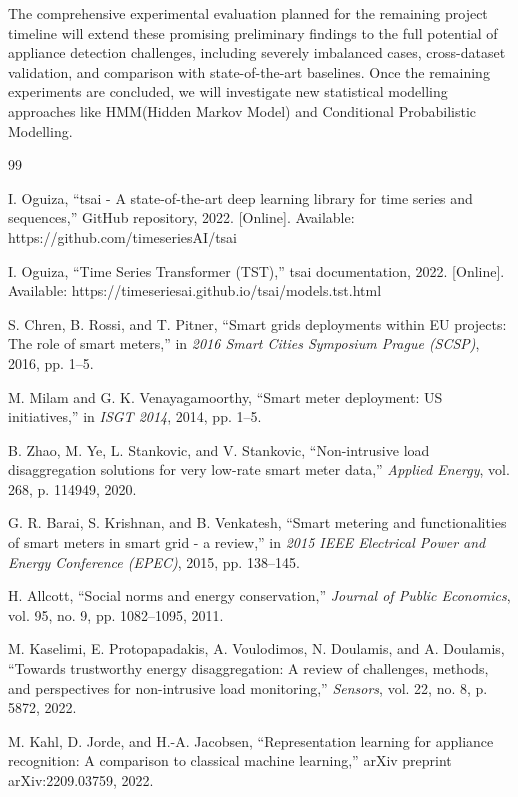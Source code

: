 \documentclass[conference]{IEEEtran}
\begin{document}
The comprehensive experimental evaluation planned for the remaining project timeline will extend these promising preliminary findings to the full potential of appliance detection challenges, including severely imbalanced cases, cross-dataset validation, and comparison with state-of-the-art baselines. Once the remaining experiments are concluded, we will investigate new statistical modelling approaches like HMM(Hidden Markov Model) and Conditional Probabilistic Modelling.
\begin{thebibliography}{99}

I. Oguiza, ``tsai - A state-of-the-art deep learning library for time series and sequences,'' GitHub repository, 2022. [Online]. Available: https://github.com/timeseriesAI/tsai

I. Oguiza, ``Time Series Transformer (TST),'' tsai documentation, 2022. [Online]. Available: https://timeseriesai.github.io/tsai/models.tst.html

S. Chren, B. Rossi, and T. Pitner, ``Smart grids deployments within EU projects: The role of smart meters,'' in \textit{2016 Smart Cities Symposium Prague (SCSP)}, 2016, pp. 1--5.

M. Milam and G. K. Venayagamoorthy, ``Smart meter deployment: US initiatives,'' in \textit{ISGT 2014}, 2014, pp. 1--5.

B. Zhao, M. Ye, L. Stankovic, and V. Stankovic, ``Non-intrusive load disaggregation solutions for very low-rate smart meter data,'' \textit{Applied Energy}, vol. 268, p. 114949, 2020.

G. R. Barai, S. Krishnan, and B. Venkatesh, ``Smart metering and functionalities of smart meters in smart grid - a review,'' in \textit{2015 IEEE Electrical Power and Energy Conference (EPEC)}, 2015, pp. 138--145.

H. Allcott, ``Social norms and energy conservation,'' \textit{Journal of Public Economics}, vol. 95, no. 9, pp. 1082--1095, 2011.

M. Kaselimi, E. Protopapadakis, A. Voulodimos, N. Doulamis, and A. Doulamis, ``Towards trustworthy energy disaggregation: A review of challenges, methods, and perspectives for non-intrusive load monitoring,'' \textit{Sensors}, vol. 22, no. 8, p. 5872, 2022.

M. Kahl, D. Jorde, and H.-A. Jacobsen, ``Representation learning for appliance recognition: A comparison to classical machine learning,'' arXiv preprint arXiv:2209.03759, 2022.


\end{thebibliography}
\end{document}

